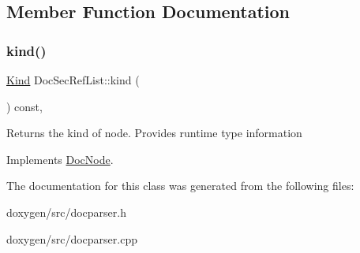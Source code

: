\subsection{Member Function Documentation}
\mbox{\label{class_doc_sec_ref_list_a18c10aaace4f6fdaadb62fc08d58d06f}} 
\subsubsection{\texorpdfstring{kind()}{kind()}}
{\footnotesize\ttfamily \mbox{\hyperlink{class_doc_node_aebd16e89ca590d84cbd40543ea5faadb}{Kind}} Doc\+Sec\+Ref\+List\+::kind (\begin{DoxyParamCaption}{ }\end{DoxyParamCaption}) const\hspace{0.3cm}{\ttfamily [inline]}, {\ttfamily [virtual]}}

Returns the kind of node. Provides runtime type information 

Implements \mbox{\hyperlink{class_doc_node_a108ffd214a72ba6e93dac084a8f58049}{Doc\+Node}}.



The documentation for this class was generated from the following files\+:\begin{DoxyCompactItemize}
\item 
doxygen/src/docparser.\+h\item 
doxygen/src/docparser.\+cpp\end{DoxyCompactItemize}
